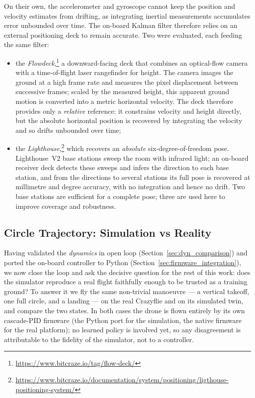 \documentclass[11pt,a4paper]{article}
\theoremstyle{remark}
\numberwithin{equation}{section}
\begin{document}
On their own, the accelerometer and gyroscope cannot keep the position and velocity
estimates from drifting, as integrating inertial measurements accumulates error
unbounded over time. The on-board Kalman filter therefore relies on an external
positioning deck to remain accurate. Two were evaluated, each feeding the same filter:
\begin{itemize}
    \item the \emph{Flowdeck},\footnote{\url{https://www.bitcraze.io/tag/flow-deck/}}
    a downward-facing deck that combines an optical-flow camera with a time-of-flight
    laser rangefinder for height. The camera images the ground at a high frame rate and
    measures the pixel displacement between successive frames; scaled by the measured
    height, this apparent ground motion is converted into a metric horizontal velocity.
    The deck therefore provides only a \emph{relative} reference: it constrains velocity
    and height directly, but the absolute horizontal position is recovered by integrating
    the velocity and so drifts unbounded over time;
    \item the \emph{Lighthouse},\footnote{\url{https://www.bitcraze.io/documentation/system/positioning/ligthouse-positioning-system/}}
    which recovers an \emph{absolute} six-degree-of-freedom pose. Lighthouse~V2 base
    stations sweep the room with infrared light; an on-board receiver deck detects these
    sweeps and infers the direction to each base station, and from the directions to
    several stations its full pose is recovered at millimetre and degree accuracy,
    with no integration and hence no drift. Two base stations are sufficient for a
    complete pose; three are used here to improve coverage and robustness.
\end{itemize}
\subsection{Circle Trajectory: Simulation vs Reality}\label{sec:circle_simreal}

Having validated the \emph{dynamics} in open loop (Section~\ref{sec:dyn_comparison})
and ported the on-board controller to Python
(Section~\ref{sec:firmware_integration}), we now close the loop and ask the
decisive question for the rest of this work: does the simulator reproduce a real
flight faithfully enough to be trusted as a training ground? To answer it we fly
the same non-trivial manoeuvre --- a vertical takeoff, one full circle, and a
landing --- on the real Crazyflie and on its simulated twin, and compare the two
states. In both cases the drone is flown entirely by its own cascade-PID firmware
(the Python port for the simulation, the native firmware for the real platform);
no learned policy is involved yet, so any disagreement is attributable to the
fidelity of the simulator, not to a controller.
\end{document}
